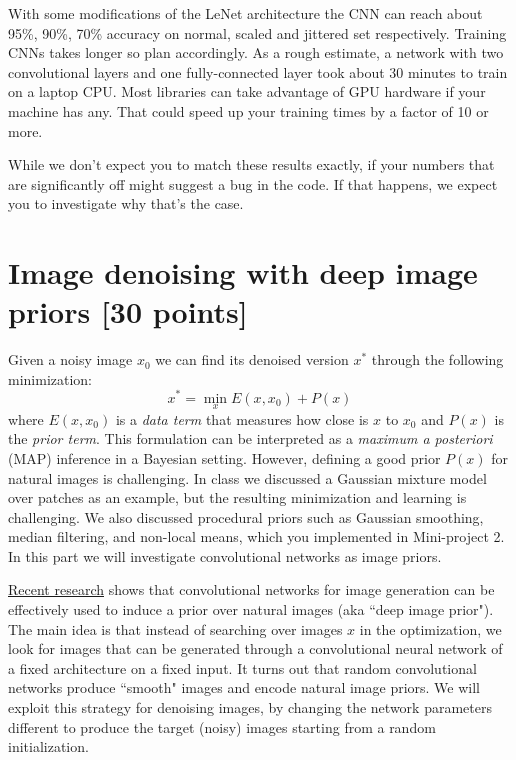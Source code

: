 \documentclass[10pt,letterpaper]{article}
\begin{document}
With some modifications of the LeNet architecture the CNN can reach about 95\%, 90\%, 70\% accuracy on normal, scaled and jittered set respectively. 
Training CNNs takes longer so plan accordingly. 
As a rough estimate, a network with two convolutional layers and one fully-connected layer took about 30 minutes to train on a laptop CPU.
Most libraries can take advantage of GPU hardware if your machine has any. That could speed up your training times by a factor of 10 or more.

While we don't expect you to match these results exactly, if your numbers that are significantly off  might suggest a bug in the code. If that happens, we expect you to investigate why that's the case.

\newpage

\section{Image denoising with deep image priors [30 points]}

Given a noisy image $x_0$ we can find its denoised version $x^*$ through the following minimization:
\begin{equation}
x^* = \min_x E(x, x_0) + P(x)
\end{equation}
where $E(x, x_0)$ is a \emph{data term} that measures how close is $x$ to $x_0$ and $P(x)$ is the \emph{prior term}.
This formulation can be interpreted as a \emph{maximum a posteriori} (MAP) inference in a Bayesian setting.
However, defining a good prior $P(x)$ for natural images is challenging. 
In class we discussed a Gaussian mixture model over patches as an example, but the resulting minimization and learning is challenging. 
We also discussed procedural priors such as Gaussian smoothing, median filtering, and non-local means, which you implemented in Mini-project 2. 
In this part we will investigate convolutional networks as image priors.


\href{https://arxiv.org/abs/1711.10925}{Recent research} shows that convolutional networks for image generation can be effectively used to induce a prior over natural images (aka ``deep image prior").
The main idea is that instead of searching over images $x$ in the optimization, we look for images that can be generated through a convolutional neural network of a fixed architecture on a fixed input.
It turns out that random convolutional networks produce ``smooth" images and encode natural image priors. 
We will exploit this strategy for denoising images, by changing the network parameters different to produce the target (noisy) images starting from a random initialization.
\end{document}
